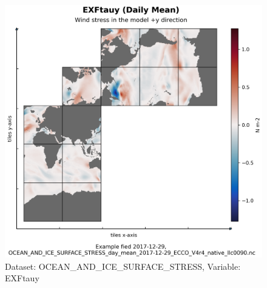 \begin{figure}[H]
\centering
\includegraphics[scale=0.55]{../images/plots/native_plots/Ocean_and_Sea-Ice_Surface_Stress/EXFtauy.png}
\caption{Dataset: OCEAN\_AND\_ICE\_SURFACE\_STRESS, Variable: EXFtauy}
\label{tab:table-OCEAN_AND_ICE_SURFACE_STRESS_EXFtauy-Plot}
\end{figure}
\pagebreak
